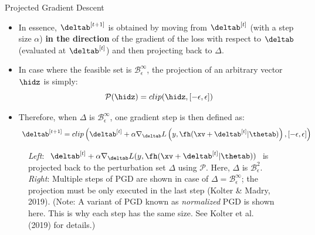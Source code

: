 \begin{vbframe}{Projected Gradient Descent}
\begin{itemize}
        
        
        \item In essence, $\deltab^{[t+1]}$ is obtained by moving from $\deltab^{[t]}$ (with a step size $\alpha$) \textbf{in the direction} of the gradient of the loss with respect to $\deltab$ (evaluated at $\deltab^{[t]}$) and then projecting back to $\Delta$.
        \item In case where the feasible set is $\mathcal{B}^{\infty}_{\epsilon}$, the projection of an arbitrary vector $\hidz$ is simply:
        \begin{equation*}
            \mathcal{P}(\hidz) = clip(\hidz, [-\epsilon, \epsilon])
        \end{equation*}
        \item Therefore, when $\Delta$ is $\mathcal{B}^{\infty}_{\epsilon}$, one gradient step is then defined as: 
        \begin{equation*}
            \deltab^{[t+1]} = clip\left(\deltab^{[t]}+ \alpha \nabla_{\deltab} L\left(y, \fh(\xv + \deltab^{[t]}| \thetab) \right), [-\epsilon, \epsilon]\right)
        \end{equation*}
        \end{itemize}
        \vspace{-0.5cm}
          \begin{figure}
    \centering
      \caption{\small{\textit{Left}: $\deltab^{[t]}+ \alpha \nabla_{\deltab} L(y, \fh(\xv + \deltab^{[t]}| \thetab))$ is projected back to the perturbation set $\Delta$ using $\mathcal{P}$. Here, $\Delta$ is $\mathcal{B}^{2}_{\epsilon}$.
      \textit{Right}: Multiple steps of PGD are shown in case of $\Delta = \mathcal{B}^{\infty}_{\epsilon}$; the projection must be only executed in the last step (Kolter \& Madry, 2019). (Note: A variant of PGD known as \textit{normalized} PGD is shown here. This is why each step has the same size. See Kolter et al. (2019) for details.)}}
  \end{figure}
    
\end{vbframe}
   
